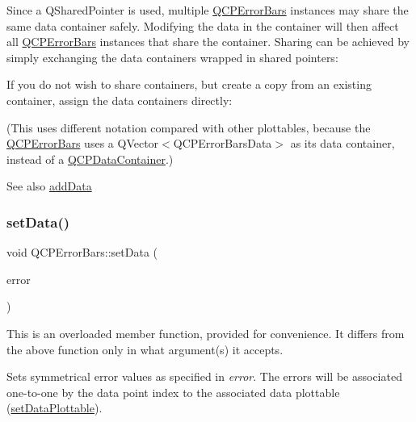 Since a Q\+Shared\+Pointer is used, multiple \hyperlink{class_q_c_p_error_bars}{Q\+C\+P\+Error\+Bars} instances may share the same data container safely. Modifying the data in the container will then affect all \hyperlink{class_q_c_p_error_bars}{Q\+C\+P\+Error\+Bars} instances that share the container. Sharing can be achieved by simply exchanging the data containers wrapped in shared pointers\+: 
\begin{DoxyCodeInclude}
\end{DoxyCodeInclude}
 If you do not wish to share containers, but create a copy from an existing container, assign the data containers directly\+: 
\begin{DoxyCodeInclude}
\end{DoxyCodeInclude}
(This uses different notation compared with other plottables, because the \hyperlink{class_q_c_p_error_bars}{Q\+C\+P\+Error\+Bars} uses a {\ttfamily Q\+Vector$<$\+Q\+C\+P\+Error\+Bars\+Data$>$} as its data container, instead of a \hyperlink{class_q_c_p_data_container}{Q\+C\+P\+Data\+Container}.)

\begin{DoxySeeAlso}{See also}
\hyperlink{class_q_c_p_error_bars_aae296ad9817b3fa418db284af81cecf8}{add\+Data} 
\end{DoxySeeAlso}
\mbox{\label{class_q_c_p_error_bars_a2f33d68a7ec163b09017dce3d9d3abcc}} 
\subsubsection{\texorpdfstring{set\+Data()}{setData()}\hspace{0.1cm}{\footnotesize\ttfamily [2/3]}}
{\footnotesize\ttfamily void Q\+C\+P\+Error\+Bars\+::set\+Data (\begin{DoxyParamCaption}\item[{const Q\+Vector$<$ double $>$ \&}]{error }\end{DoxyParamCaption})}

This is an overloaded member function, provided for convenience. It differs from the above function only in what argument(s) it accepts.

Sets symmetrical error values as specified in {\itshape error}. The errors will be associated one-\/to-\/one by the data point index to the associated data plottable (\hyperlink{class_q_c_p_error_bars_aabb42a964cfbf780cd1c79850c7cd989}{set\+Data\+Plottable}).

